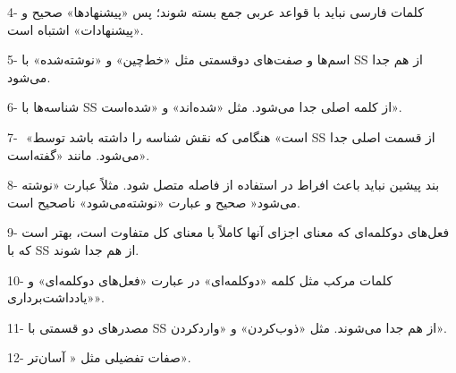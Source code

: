 4-	كلمات فارسی نباید با قواعد عربی جمع بسته شوند؛ پس «پیشنهادها» صحیح و «پیشنهادات» اشتباه است‌.‌

5-	اسم‌ها و صفت‌های دو‌قسمتی مثل «خط‌چین» و «نوشته‌شده» با SS از هم جدا می‌شود‌.‌

6-	شناسه‌ها با SS از كلمه اصلی جدا می‌شود‌.‌ مثل «شده‌اند»‌ و «شده‌است». 

7-	‌ «است» هنگامی كه نقش شناسه را داشته باشد توسط SS از قسمت اصلی جدا می‌شود‌.‌ مانند «گفته‌است»‌.

8-	بند پیشین نباید باعث افراط در استفاده از فاصله متصل شود. مثلاً عبارت «نوشته می‌شود‌« صحیح و عبارت «نوشته‌می‌شود» ناصحیح است. 

9-	فعل‌های دو‌كلمه‌ای كه معنای اجزای آنها كاملاً با معنای كل متفاوت است، بهتر است كه با SS از هم جدا ‌شوند‌.‌

10-	كلمات مركب مثل كلمه «دوكلمه‌ای» در عبارت «فعل‌های دوكلمه‌ای» و «یادداشت‌برداری».

11-	مصدرهای دو قسمتی با SS از هم جدا می‌شوند‌.‌ مثل «ذوب‌كردن» و «واردكردن»‌.

12-	 صفات تفضیلی مثل « آسان‌تر».
